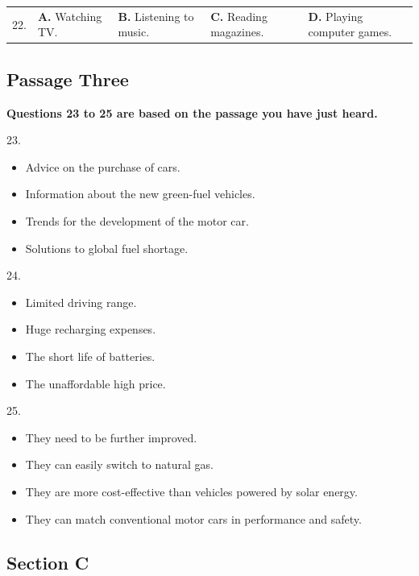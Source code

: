 \documentclass[UTF8,11pt]{ctexart}
\begin{document}
\noindent\begin{tabularx}{\linewidth}{@{}lXXXX@{}}22. & \textbf{A.} Watching TV. & \textbf{B.} Listening to music. & \textbf{C.} Reading magazines. & \textbf{D.} Playing computer games.\\\end{tabularx}\par

\subsection*{\textbf{Passage Three}}


\textbf{Questions 23 to 25 are based on the passage you have just heard.}


23.


\begin{itemize}[leftmargin=2em,itemsep=.2em,topsep=.4em]\item[A.] Advice on the purchase of cars.
\item[B.] Information about the new green-fuel vehicles.
\item[C.] Trends for the development of the motor car.
\item[D.] Solutions to global fuel shortage.
\end{itemize}

24.


\begin{itemize}[leftmargin=2em,itemsep=.2em,topsep=.4em]\item[A.] Limited driving range.
\item[B.] Huge recharging expenses.
\item[C.] The short life of batteries.
\item[D.] The unaffordable high price.
\end{itemize}

25.


\begin{itemize}[leftmargin=2em,itemsep=.2em,topsep=.4em]\item[A.] They need to be further improved.
\item[B.] They can easily switch to natural gas.
\item[C.] They are more cost-effective than vehicles powered by solar energy.
\item[D.] They can match conventional motor cars in performance and safety.
\end{itemize}

\subsection*{\textbf{Section C}}
\end{document}

